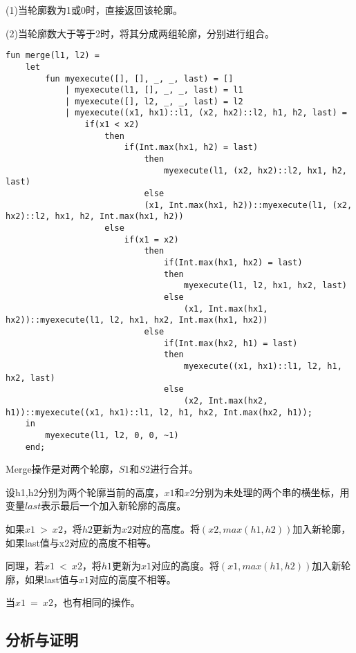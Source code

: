 \documentclass[UTF8,a4paperdui, %
]{ctexart}
\begin{document}
(1)当轮廓数为1或0时，直接返回该轮廓。

(2)当轮廓数大于等于2时，将其分成两组轮廓，分别进行组合。

\begin{lstlisting}
fun merge(l1, l2) = 
    let
        fun myexecute([], [], _, _, last) = []
            | myexecute(l1, [], _, _, last) = l1
            | myexecute([], l2, _, _, last) = l2
            | myexecute((x1, hx1)::l1, (x2, hx2)::l2, h1, h2, last) = 
                if(x1 < x2)
                    then
                        if(Int.max(hx1, h2) = last)
                            then
                                myexecute(l1, (x2, hx2)::l2, hx1, h2, last)
                            else
                            (x1, Int.max(hx1, h2))::myexecute(l1, (x2, hx2)::l2, hx1, h2, Int.max(hx1, h2))
                    else
                        if(x1 = x2)
                            then
                                if(Int.max(hx1, hx2) = last)
                                then
                                    myexecute(l1, l2, hx1, hx2, last)
                                else
                                    (x1, Int.max(hx1, hx2))::myexecute(l1, l2, hx1, hx2, Int.max(hx1, hx2))
                            else
                                if(Int.max(hx2, h1) = last)
                                then
                                    myexecute((x1, hx1)::l1, l2, h1, hx2, last)
                                else
                                    (x2, Int.max(hx2, h1))::myexecute((x1, hx1)::l1, l2, h1, hx2, Int.max(hx2, h1));
    in
        myexecute(l1, l2, 0, 0, ~1)
    end;
\end{lstlisting}

Merge操作是对两个轮廓，$S1$和$S2$进行合并。

设h1,h2分别为两个轮廓当前的高度，$x1$和$x2$分别为未处理的两个串的横坐标，用变量$last$表示最后一个加入新轮廓的高度。

如果$x1\ >\ x2$，将$h2$更新为$x2$对应的高度。将$(x2, max(h1, h2))$加入新轮廓，如果last值与x2对应的高度不相等。

同理，若$x1\ <\ x2$，将$h1$更新为$x1$对应的高度。将$(x1, max(h1, h2))$加入新轮廓，如果last值与$x1$对应的高度不相等。

当$x1\ =\ x2$，也有相同的操作。

\subsection{分析与证明}
\end{document}
